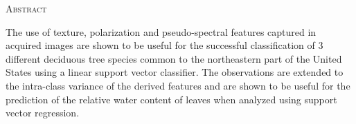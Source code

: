 \begin{center}
  \textsc{Abstract}
\end{center}
%
\noindent
%
The use of texture, polarization and pseudo-spectral features captured in
acquired images are shown to be useful for the successful classification of
3 different deciduous tree species common to the northeastern part of the
United States using a linear support vector classifier. The observations
are extended to the intra-class variance of the derived features and are shown
to be useful for the prediction of the relative water content of leaves when
analyzed using support vector regression.
